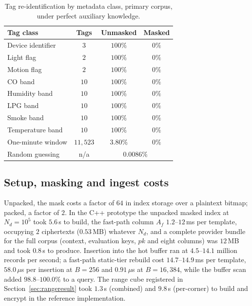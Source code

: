 \documentclass[a4paper,fleqn]{cas-sc}
\begin{document}
\begin{table}[pos=htbp]
\caption{Tag re-identification by metadata class, primary corpus, under
perfect auxiliary knowledge.}
\label{tab:leakage}
\centering
\footnotesize
\setlength{\tabcolsep}{3pt}
\renewcommand{\arraystretch}{1.15}
\begin{tabular*}{\tblwidth}{@{\extracolsep{\fill}}lccc@{}}
\toprule
Tag class & Tags & Unmasked & Masked \\
\midrule
Device identifier      & $3$      & $100\%$ & $0\%$ \\
Light flag             & $2$      & $100\%$ & $0\%$ \\
Motion flag            & $2$      & $100\%$ & $0\%$ \\
CO band                & $10$     & $100\%$ & $0\%$ \\
Humidity band          & $10$     & $100\%$ & $0\%$ \\
LPG band               & $10$     & $100\%$ & $0\%$ \\
Smoke band             & $10$     & $100\%$ & $0\%$ \\
Temperature band       & $10$     & $100\%$ & $0\%$ \\
One-minute window      & $11{,}523$ & $3.80\%$ & $0\%$ \\
\midrule
Random guessing        & n/a      & \multicolumn{2}{c}{$0.0086\%$} \\
\bottomrule
\end{tabular*}
\end{table}

\subsection{Setup, masking and ingest costs}
\label{sec:setupresult}
Unpacked, the mask costs a factor of $64$ in index storage over a plaintext
bitmap; packed, a factor of $2$. In the C++ prototype the unpacked masked index
at $N_d=10^5$ took $5.6$\,s to build, the fast-path column $A_f$ $1.2$--$12$\,ms
per template, occupying $2$ ciphertexts ($0.53$\,MB) whatever $N_d$, and a
complete provider bundle for the full corpus (context, evaluation keys, $pk$
and eight columns) was $12$\,MB and took $0.8$\,s to produce. Insertion into the hot
buffer ran at $4.5$--$14.1$ million records per second; a fast-path static-tier
rebuild cost $14.7$--$14.9$\,ms per template, $58.0\,\mu$s per insertion at
$B=256$ and $0.91\,\mu$s at $B=16{,}384$, while the buffer scan added
$98.8$--$100.0\%$ to a query. The range cube registered in
Section~\ref{sec:rangeresult} took $1.3$\,s (combined) and $9.8$\,s
(per-corner) to build and encrypt in the reference implementation.
\end{document}

